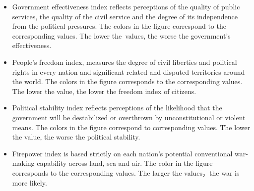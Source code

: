 \documentclass{mcmthesis}
\begin{document}
\begin{itemize}
  \item Government effectiveness index reflects perceptions of the quality of public services, the quality of the civil service and the degree of its independence from the political pressures. The colors in the figure correspond to the corresponding values. The lower the values, the worse the government’s effectiveness.
  \item People's freedom index, measures the degree of civil liberties and political rights in every nation and significant related and disputed territories around the world. The colors in the figure corresponds to the corresponding values. The lower the value, the lower the freedom index of citizens.
  \item Political stability index reflects perceptions of the likelihood that the government will be destabilized or overthrown by unconstitutional or violent means. The colors in the figure correspond to corresponding values. The lower the value, the worse the political stability.
  \item Firepower index is based strictly on each nation's potential conventional war-making capability across land, sea and air. The color in the figure corresponds to the corresponding values. The larger the values，the war is more likely.
\end{itemize}
\end{document}
